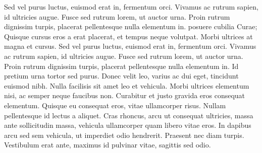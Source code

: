 \documentclass[twoside]{scrartcl}
\begin{document}
\autoversenumber Sed vel purus luctus, euismod erat in, fermentum orci.
\autoversenumber Vivamus ac rutrum sapien, id ultricies augue.
\autoversenumber Fusce sed rutrum lorem, ut auctor urna.
\autoversenumber Proin rutrum dignissim turpis, placerat pellentesque nulla elementum in.
\autoversenumber posuere cubilia Curae; Quisque cursus eros a erat placerat, et tempus neque volutpat.
\autoversenumber Morbi ultrices at magna et cursus.
\autoversenumber Sed vel purus luctus, euismod erat in, fermentum orci.
\autoversenumber Vivamus ac rutrum sapien, id ultricies augue.
\autoversenumber Fusce sed rutrum lorem, ut auctor urna.
\autoversenumber Proin rutrum dignissim turpis, placerat pellentesque nulla elementum in.
\autoversenumber Id pretium urna tortor sed purus.
\autoversenumber Donec velit leo, varius ac dui eget, tincidunt euismod nibh.
\autoversenumber Nulla facilisis sit amet leo et vehicula.
\autoversenumber Morbi ultrices elementum nisi, ac semper neque faucibus non.
\autoversenumber Curabitur et justo gravida eros consequat elementum.
\autoversenumber Quisque eu consequat eros, vitae ullamcorper risus.
\autoversenumber Nullam pellentesque id lectus a aliquet.
\autoversenumber Cras rhoncus, arcu ut consequat ultricies, massa ante sollicitudin massa, vehicula ullamcorper quam libero vitae eros.
\autoversenumber In dapibus arcu sed sem vehicula, ut imperdiet odio hendrerit.
\autoversenumber Praesent nec diam turpis.
\autoversenumber Vestibulum erat ante, maximus id pulvinar vitae, sagittis sed odio.

\pend
\endnumbering
\end{document}
